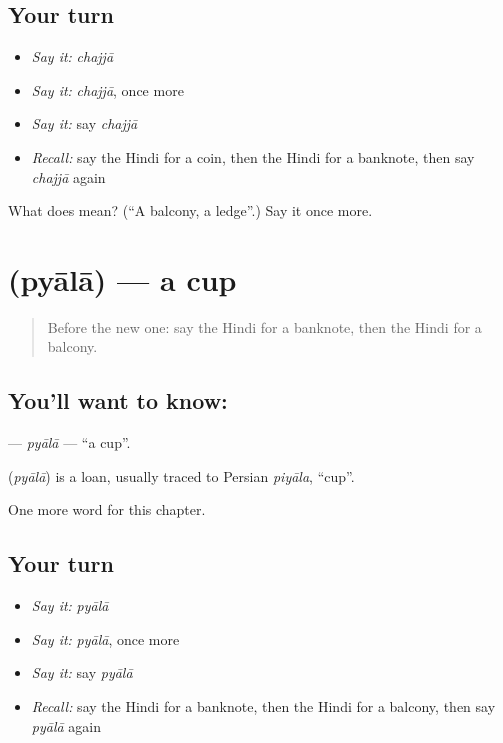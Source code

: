\subsection*{Your turn}
\begin{itemize}
\raggedright
  \item \emph{Say it:} \emph{chajjā}
  \item \emph{Say it:} \emph{chajjā}, once more
  \item \emph{Say it:} say \emph{chajjā}
  \item \emph{Recall:} say the Hindi for a coin, then the Hindi for a banknote, then say \emph{chajjā} again
\end{itemize}

\begin{tcolorbox}[breakable,colback=teal!4,colframe=teal!35!black,title={Before you move on}]
What does  mean? (\textquotedblleft{}A balcony, a ledge\textquotedblright{}.) Say it once more.
\end{tcolorbox}
\section[\texorpdfstring{\hi{प्याला} (pyālā)}{प्याला (pyālā)}]{ (pyālā) — a cup}

\label{lesson:HI-C209-pyala}



\begin{quote}
Before the new one: say the Hindi for a banknote, then the Hindi for a balcony.
\end{quote}

\subsection*{You'll want to know: }
\textbf{} — \emph{pyālā} — \textquotedblleft{}a cup\textquotedblright{}.

\begin{cousinweb}
\textbf{} (\emph{pyālā}) is a loan, usually traced to Persian \emph{piyāla}, \textquotedblleft{}cup\textquotedblright{}.
\end{cousinweb}

\begin{grammarlens}[title={What you've built}]
One more word for this chapter.
\end{grammarlens}

\subsection*{Your turn}
\begin{itemize}
\raggedright
  \item \emph{Say it:} \emph{pyālā}
  \item \emph{Say it:} \emph{pyālā}, once more
  \item \emph{Say it:} say \emph{pyālā}
  \item \emph{Recall:} say the Hindi for a banknote, then the Hindi for a balcony, then say \emph{pyālā} again
\end{itemize}

